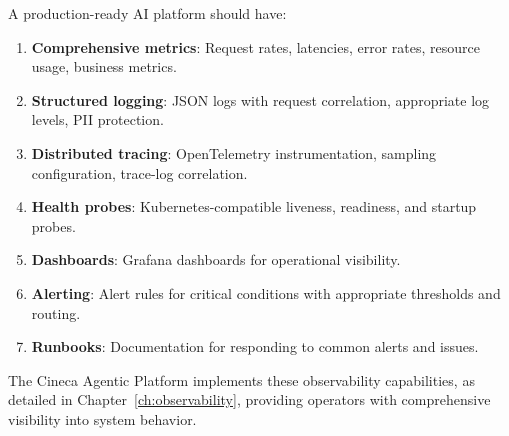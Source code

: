 A production-ready AI platform should have:

\begin{enumerate}
    \item \textbf{Comprehensive metrics}: Request rates, latencies, error rates, resource usage, business metrics.
    
    \item \textbf{Structured logging}: JSON logs with request correlation, appropriate log levels, PII protection.
    
    \item \textbf{Distributed tracing}: OpenTelemetry instrumentation, sampling configuration, trace-log correlation.
    
    \item \textbf{Health probes}: Kubernetes-compatible liveness, readiness, and startup probes.
    
    \item \textbf{Dashboards}: Grafana dashboards for operational visibility.
    
    \item \textbf{Alerting}: Alert rules for critical conditions with appropriate thresholds and routing.
    
    \item \textbf{Runbooks}: Documentation for responding to common alerts and issues.
\end{enumerate}

The Cineca Agentic Platform implements these observability capabilities, as detailed in Chapter~\ref{ch:observability}, providing operators with comprehensive visibility into system behavior.
